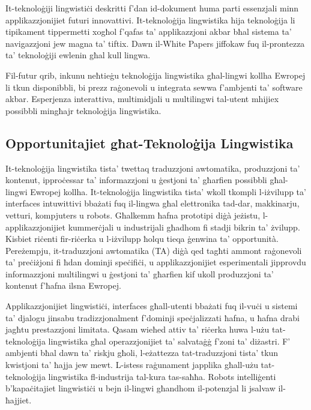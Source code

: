 \documentclass[]{../../metanetpaper}
\begin{document}
\begin{multicols}{2}
It-teknoloġiji lingwistiċi deskritti f'dan id-dokument huma parti essenzjali minn applikazzjonijiet futuri innovattivi. It-teknoloġija lingwistika hija teknoloġija li tipikament tippermetti xogħol f'qafas ta’ applikazzjoni akbar bħal sistema ta’ navigazzjoni jew magna ta’ tiftix. Dawn il-White Papers jiffokaw fuq il-prontezza ta’ teknoloġiji ewlenin għal kull lingwa.
  
Fil-futur qrib, inkunu neħtieġu teknoloġija lingwistika għal-lingwi kollha Ewropej li tkun disponibbli, bi prezz raġonevoli u integrata sewwa f’ambjenti ta’ software akbar. Esperjenza interattiva, multimidjali u multilingwi tal-utent mhijiex possibbli mingħajr teknoloġija lingwistika.

\subsection{Opportunitajiet għat-Teknoloġija Lingwistika}

It-teknoloġija lingwistika tista’ twettaq traduzzjoni awtomatika, produzzjoni ta’ kontenut, ipproċessar ta’ informazzjoni u ġestjoni ta’ għarfien possibbli għal-lingwi Ewropej kollha. It-teknoloġija lingwistika tista’ wkoll tkompli l-iżvilupp ta’ interfaces intuwittivi bbażati fuq il-lingwa għal elettronika tad-dar, makkinarju, vetturi, kompjuters u robots. Għalkemm ħafna prototipi diġà jeżistu, l-applikazzjonijiet kummerċjali u industrijali għadhom fi stadji bikrin ta’ żvilupp. Kisbiet riċenti fir-riċerka u l-iżvilupp ħolqu tieqa ġenwina ta’ opportunità. Pereżempju, it-traduzzjoni awtomatika (TA) diġà qed tagħti ammont raġonevoli ta’ preċiżjoni fi ħdan dominji speċifiċi, u applikazzjonijiet esperimentali jipprovdu informazzjoni multilingwi u ġestjoni ta’ għarfien kif ukoll produzzjoni ta’ kontenut f’ħafna ilsna Ewropej.

Applikazzjonijiet lingwistiċi, interfaces għall-utenti bbażati fuq il-vuċi u sistemi ta’ djalogu jinsabu tradizzjonalment f’dominji speċjalizzati ħafna, u ħafna drabi jagħtu prestazzjoni limitata. Qasam wieħed attiv ta’ riċerka huwa l-użu tat-teknoloġija lingwistika għal operazzjonijiet ta’ salvataġġ f'zoni ta’ diżastri. F’ ambjenti bħal dawn ta’ riskju għoli, l-eżattezza tat-traduzzjoni tista’ tkun kwistjoni ta’ ħajja jew mewt. L-istess raġunament japplika għall-użu tat-teknoloġija lingwistika fl-industrija tal-kura tas-saħħa. Robots intelliġenti b’kapaċitajiet lingwistiċi u bejn il-lingwi għandhom il-potenzjal li jsalvaw il-ħajjiet.


\end{multicols}
\end{document}
